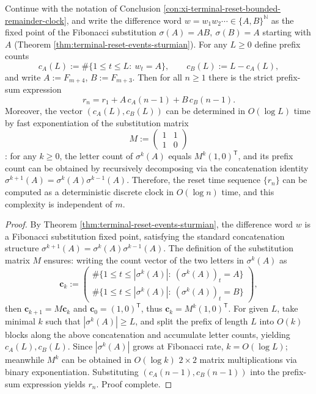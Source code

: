 \begin{conclusion}\label{con:xi-terminal-reset-clock-logtime}
Continue with the notation of Conclusion \ref{con:xi-terminal-reset-bounded-remainder-clock}, and write the difference word
\(
w=w_1w_2\cdots\in\{A,B\}^{\mathbb N}
\)
as the fixed point of the Fibonacci substitution
\(
\sigma(A)=AB,\ \sigma(B)=A
\)
starting with \(A\) (Theorem \ref{thm:terminal-reset-events-sturmian}).
For any \(L\ge 0\) define prefix counts
\[
c_A(L):=\#\{1\le t\le L:\ w_t=A\},\qquad
c_B(L):=L-c_A(L),
\]
and write \(A:=F_{m+4}\), \(B:=F_{m+3}\).
Then for all \(n\ge 1\) there is the strict prefix-sum expression
\[
r_n=r_1+A\,c_A(n-1)+B\,c_B(n-1).
\]
Moreover, the vector \((c_A(L),c_B(L))\) can be determined in \(O(\log L)\) time by fast exponentiation of the substitution matrix
\[
M:=\begin{pmatrix}1&1\\ 1&0\end{pmatrix}
\]
: for any \(k\ge 0\), the letter count of \(\sigma^k(A)\) equals \(M^k(1,0)^{\mathsf T}\), and its prefix count can be obtained by recursively decomposing via the concatenation identity
\(
\sigma^{k+1}(A)=\sigma^k(A)\sigma^{k-1}(A)
\).
Therefore, the reset time sequence \(\{r_n\}\) can be computed as a deterministic discrete clock in \(O(\log n)\) time, and this complexity is independent of \(m\).
\end{conclusion}
\begin{proof}[Proof]
By Theorem \ref{thm:terminal-reset-events-sturmian}, the difference word \(w\) is a Fibonacci substitution fixed point, satisfying the standard concatenation structure
\(
\sigma^{k+1}(A)=\sigma^k(A)\sigma^{k-1}(A)
\).
The definition of the substitution matrix \(M\) ensures: writing the count vector of the two letters in \(\sigma^k(A)\) as
\[
\mathbf c_k:=
\begin{pmatrix}
\#\{1\le t\le |\sigma^k(A)|:\ (\sigma^k(A))_t=A\}\\
\#\{1\le t\le |\sigma^k(A)|:\ (\sigma^k(A))_t=B\}
\end{pmatrix},
\]
then \(\mathbf c_{k+1}=M\mathbf c_k\) and \(\mathbf c_0=(1,0)^{\mathsf T}\), thus \(\mathbf c_k=M^k(1,0)^{\mathsf T}\).
For given \(L\), take minimal \(k\) such that \(|\sigma^k(A)|\ge L\), and split the prefix of length \(L\) into \(O(k)\) blocks along the above concatenation and accumulate letter counts, yielding \(c_A(L),c_B(L)\).
Since \(|\sigma^k(A)|\) grows at Fibonacci rate, \(k=O(\log L)\); meanwhile \(M^k\) can be obtained in \(O(\log k)\) \(2\times 2\) matrix multiplications via binary exponentiation.
Substituting \((c_A(n-1),c_B(n-1))\) into the prefix-sum expression yields \(r_n\). Proof complete.
\end{proof}

